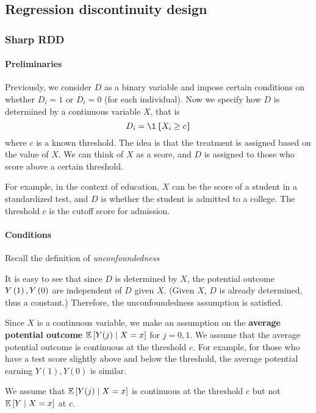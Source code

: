 \subsection{Regression discontinuity design}
\subsubsection{Sharp RDD}
\paragraph{Preliminaries}
Previously, we consider $D$ as a binary variable and impose certain conditions
on whether $D_i=1$ or $D_i=0$ (for each individual). Now we specify how $D$ is
determined by a continuous variable $X$, that is $$D_i=\1\set{X_i\ge c}$$ where
$c$ is a known threshold. The idea is that the treatment is assigned based on
the value of $X$. We can think of $X$ as a score, and $D$ is assigned to those
who score above a certain threshold.

For example, in the context of education, $X$ can be the score of a student in
a standardized test, and $D$ is whether the student is admitted to a college.
The threshold $c$ is the cutoff score for admission.

\paragraph{Conditions}
Recall the definition of \emph{unconfoundedness}

It is easy to see that since $D$ is determined by $X$, the potential outcome
$Y\left(1\right),Y\left(0\right)$ are independent of $D$ given $X$. (Given $X$, $D$ is already
determined, thus a constant.) Therefore, the unconfoundedness assumption is
satisfied.

Since $X$ is a continuous variable, we make an assumption on the
\textbf{average potential outcome} $\mathbb{E}\left[Y(j)\mid X=x\right]$ for $j=0,1$. We
assume that the average potential outcome is continuous at the threshold $c$.
For example, for those who have a test score slightly above and below the
threshold, the average potential earning $Y(1),Y(0)$ is similar.
\begin{remark}
    We assume that $\mathbb{E}\left[Y(j)\mid X=x\right]$ is continuous at the threshold $c$ but not $\mathbb{E}\left[Y\mid X=x\right]$ at $c$.
\end{remark}

